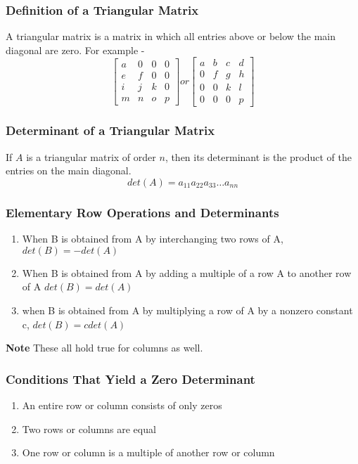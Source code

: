 \documentclass[12pt, letterpaper, twoside]{article}
\begin{document}
\subsubsection*{Definition of a Triangular Matrix}
A triangular matrix is a matrix in which all entries above or below the main diagonal are zero. For example - \\


\[
\begin{bmatrix}
 a & 0 & 0 & 0\\
 e & f & 0 & 0\\
 i & j & k & 0\\
 m & n & o & p
\end{bmatrix}
or 
\begin{bmatrix}
 a & b & c & d\\
 0 & f & g & h\\
 0 & 0 & k & l\\
 0 & 0 & 0 & p
\end{bmatrix}
\]


\subsubsection*{Determinant of a Triangular Matrix}
If $A$ is a triangular matrix of order $n$, then its determinant is the product of the entries on the main diagonal. 
$$det(A) = a_{11}a_{22}a_{33} \dots a_{nn}$$

\subsubsection*{Elementary Row Operations and Determinants}
\begin{enumerate}
\item When B is obtained from A by interchanging two rows of A, $det(B) = -det(A)$
\item When B is obtained from A by adding a multiple of a row A to another row of A $det(B) = det(A)$
\item when B is obtained from A by multiplying a row of A by a nonzero constant c, $det(B) = c det(A)$
\end{enumerate}
\textbf{Note} These all hold true for columns as well.

\subsubsection*{Conditions That Yield a Zero Determinant}
\begin{enumerate}
\item An entire row or column consists of only zeros
\item Two rows or columns are equal
\item One row or column is a multiple of another row or column
\end{enumerate}
\end{document}
